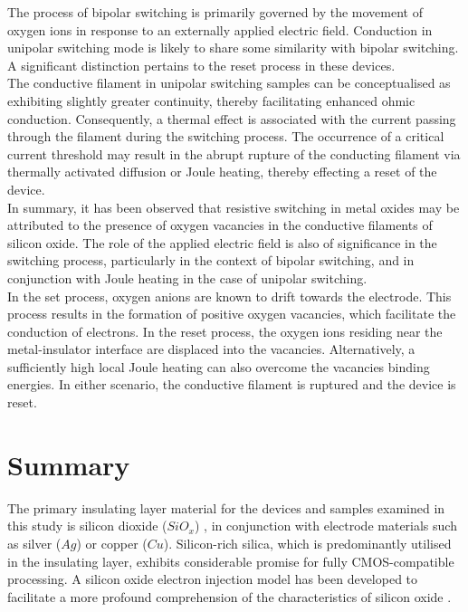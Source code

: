 \noindent The process of bipolar switching is primarily governed by the movement of oxygen ions in response to an externally applied electric field. Conduction in unipolar switching mode is likely to share some similarity with bipolar switching. A significant distinction pertains to the reset process in these devices.\\

\noindent The conductive filament in unipolar switching samples can be conceptualised as exhibiting slightly greater continuity, thereby facilitating enhanced ohmic conduction. Consequently, a thermal effect is associated with the current passing through the filament during the switching process. The occurrence of a critical current threshold may result in the abrupt rupture of the conducting filament via thermally activated diffusion or Joule heating, thereby effecting a reset of the device.\\

\noindent In summary, it has been observed that resistive switching in metal oxides may be attributed to the presence of oxygen vacancies in the conductive filaments of silicon oxide. The role of the applied electric field is also of significance in the switching process, particularly in the context of bipolar switching, and in conjunction with Joule heating in the case of unipolar switching.\\

\noindent In the set process, oxygen anions are known to drift towards the electrode. This process results in the formation of positive oxygen vacancies, which facilitate the conduction of electrons. In the reset process, the oxygen ions residing near the metal-insulator interface are displaced into the vacancies. Alternatively, a sufficiently high local Joule heating can also overcome the vacancies binding energies. In either scenario, the conductive filament is ruptured and the device is reset.



\section[Summary]{Summary}

The primary insulating layer material for the devices and samples examined in this study is silicon dioxide ($SiO_x$) \cite{mehonic2012resistive}, in conjunction with electrode materials such as silver ($Ag$) or copper ($Cu$). Silicon-rich silica, which is predominantly utilised in the insulating layer, exhibits considerable promise for fully CMOS-compatible processing. A silicon oxide electron injection model has been developed to facilitate a more profound comprehension of the characteristics of silicon oxide \cite{gao2016mechanism}. \\

